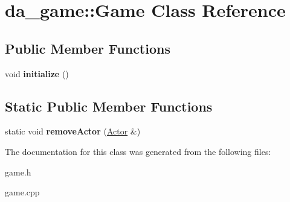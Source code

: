 \hypertarget{classda__game_1_1Game}{
\section{da\_\-game::Game Class Reference}
\label{classda__game_1_1Game}
}
\subsection*{Public Member Functions}
\begin{DoxyCompactItemize}
\item 
\hypertarget{classda__game_1_1Game_aa88f274b8ac3f044da844a0ebc0d9070}{
void {\bfseries initialize} ()}
\label{classda__game_1_1Game_aa88f274b8ac3f044da844a0ebc0d9070}

\end{DoxyCompactItemize}
\subsection*{Static Public Member Functions}
\begin{DoxyCompactItemize}
\item 
\hypertarget{classda__game_1_1Game_a90ae0fd02e47d471a07d1e1958e6e06a}{
static void {\bfseries removeActor} (\hyperlink{classda__game_1_1Actor}{Actor} \&)}
\label{classda__game_1_1Game_a90ae0fd02e47d471a07d1e1958e6e06a}

\end{DoxyCompactItemize}


The documentation for this class was generated from the following files:\begin{DoxyCompactItemize}
\item 
game.h\item 
game.cpp\end{DoxyCompactItemize}

